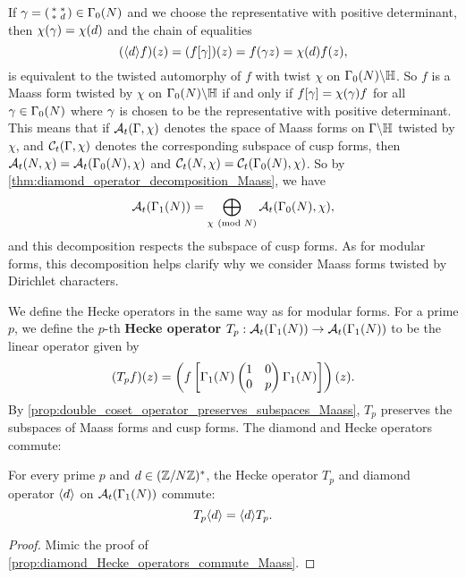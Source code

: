       If $\gamma = \begin{psmallmatrix} \ast & \ast \\ \ast & d \end{psmallmatrix} \in \Gamma_{0}(N)$ and we choose the representative with positive determinant, then $\chi(\gamma) = \chi(d)$ and the chain of equalities
      \[
        (\langle d\rangle f)(z) = (f[\gamma])(z) = f(\gamma z) = \chi(d)f(z),
      \]
      is equivalent to the twisted automorphy of $f$ with twist $\chi$ on $\Gamma_{0}(N)\backslash\mathbb{H}$. So $f$ is a Maass form twisted by $\chi$ on $\Gamma_{0}(N)\backslash\mathbb{H}$ if and only if $f[\gamma] = \chi(\gamma)f$ for all $\gamma \in \Gamma_{0}(N)$ where $\gamma$ is chosen to be the representative with positive determinant. This means that if $\mathcal{A}_{t}(\Gamma,\chi)$ denotes the space of Maass forms on $\Gamma\backslash\mathbb{H}$ twisted by $\chi$, and $\mathcal{C}_{t}(\Gamma,\chi)$ denotes the corresponding subspace of cusp forms, then $\mathcal{A}_{t}(N,\chi) = \mathcal{A}_{t}(\Gamma_{0}(N),\chi)$ and $\mathcal{C}_{t}(N,\chi) = \mathcal{C}_{t}(\Gamma_{0}(N),\chi)$. So by \cref{thm:diamond_operator_decomposition_Maass}, we have
      \[
        \mathcal{A}_{t}(\Gamma_{1}(N)) = \bigoplus_{\chi \ \left(\text{mod }N\right)}\mathcal{A}_{t}(\Gamma_{0}(N),\chi),
      \]
      and this decomposition respects the subspace of cusp forms. As for modular forms, this decomposition helps clarify why we consider Maass forms twisted by Dirichlet characters.
      
      We define the Hecke operators in the same way as for modular forms. For a prime $p$, we define the $p$-th \textbf{Hecke operator} $T_{p}:\mathcal{A}_{t}(\Gamma_{1}(N)) \to \mathcal{A}_{t}(\Gamma_{1}(N))$ to be the linear operator given by
      \[
        (T_{p}f)(z) = \left(f\left[\Gamma_{1}(N)\begin{pmatrix} 1 & 0 \\ 0 & p \end{pmatrix}\Gamma_{1}(N)\right]\right)(z).
      \]
      By \cref{prop:double_coset_operator_preserves_subspaces_Maass}, $T_{p}$ preserves the subspaces of Maass forms and cusp forms. The diamond and Hecke operators commute:

      \begin{proposition}\label{prop:diamond_Hecke_operators_commute_Maass}
        For every prime $p$ and $d \in (\mathbb{Z}/N\mathbb{Z})^{\ast}$, the Hecke operator $T_{p}$ and diamond operator $\langle d\rangle$ on $\mathcal{A}_{t}(\Gamma_{1}(N))$ commute:
        \[
          T_{p}\langle d\rangle = \langle d\rangle T_{p}.
        \]
      \end{proposition}
      \begin{proof}
        Mimic the proof of \cref{prop:diamond_Hecke_operators_commute_Maass}.
      \end{proof}

